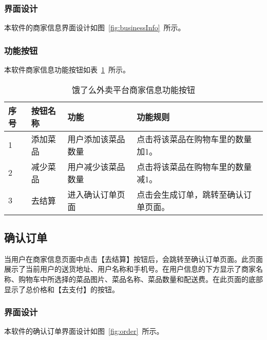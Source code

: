 \subsubsection{界面设计}
本软件的商家信息界面设计如图~\ref{fig:businessInfo}~所示。
\subsubsection{功能按钮}
本软件商家信息功能按钮如表~\ref{tab:table4}~所示。
\begin{table}[htbp]
    \caption{饿了么外卖平台商家信息功能按钮}\label{tab:table4}
    \vspace{0.5em}\wuhao
    \begin{tabularx}{\textwidth}{lllX}
    \toprule[1.5pt]
    序号 & 按钮名称 & 功能 & 功能规则 \\ 
    \midrule[1pt]
    1 & 添加菜品 & 用户添加该菜品数量 & 点击将该菜品在购物车里的数量加1。 \\
    2 & 减少菜品 & 用户减少该菜品数量 & 点击将该菜品在购物车里的数量减1。 \\
    3 & 去结算 & 进入确认订单页面 & 点击会生成订单，跳转至确认订单页面。 \\
\bottomrule[1.5pt]
\end{tabularx}
\vspace{\baselineskip}
\end{table}

\subsection{确认订单}
当用户在商家信息页面中点击【去结算】按钮后，会跳转至确认订单页面。此页面展示了当前用户的送货地址、用户名称和手机号。在用户信息的下方显示了商家名称、购物车中所选择的菜品图片、菜品名称、菜品数量和配送费。在此页面的底部显示了总价格和【去支付】的按钮。
\subsubsection{界面设计}
本软件的确认订单界面设计如图~\ref{fig:order}~所示。
